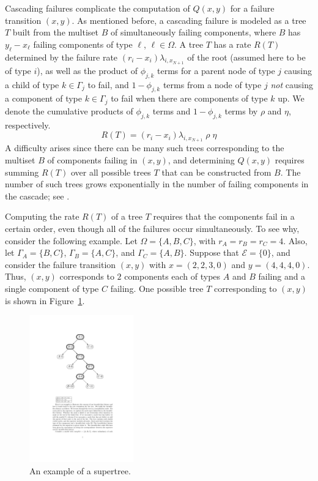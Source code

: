 \documentclass[12pt]{article}
\begin{document}
Cascading failures complicate the computation of $Q(x, y)$ for a failure transition $(x, y)$. As mentioned before, a cascading failure is modeled as a tree $T$ built from the multiset $B$ of simultaneously failing components, where $B$ has $y_\ell - x_\ell$ failing components of type $\ell$, $\ell \in \Omega$. A tree $T$ has a rate $R(T)$ determined by the failure rate $(r_i - x_i) \lambda_{i,x_{N + 1}}$ of the root (assumed here to be of type $i$), as well as the product of $\phi_{j, k}$ terms for a parent node of type $j$ causing a child of type $k \in \Gamma_j$ to fail, and $1 - \phi_{j, k}$ terms from a node of type $j$ \textit{not} causing a component of type $k \in \Gamma_j$ to fail when there are components of type $k$ up. We denote the cumulative products of $\phi_{j, k}$ terms and $1 - \phi_{j, k}$ terms by $\rho$ and $\eta$, respectively. \begin{equation} \label{eq:rate} R(T) = (r_i - x_i) \lambda_{i,x_{N + 1}} \; \rho \; \eta \end{equation} A difficulty arises since there can be many such trees corresponding to the multiset $B$ of components failing in $(x, y)$, and determining $Q(x, y)$ requires summing $R(T)$ over all possible trees $T$ that can be constructed from $B$. The number of such trees grows exponentially in the number of failing components in the cascade; see \cite{ING:2009}.

Computing the rate $R(T)$ of a tree $T$ requires that the components fail in a certain order, even though all of the failures occur simultaneously. To see why, consider the following example. Let $\Omega = \{ A, B, C \}$, with $r_A = r_B = r_C = 4$. Also, let $\Gamma_A = \{ B, C \}$, $\Gamma_B = \{ A, C \}$, and $\Gamma_C = \{ A, B \}$. Suppose that $\mathcal{E} = \{ 0 \}$, and consider the failure transition $(x, y)$ with $x = (2, 2, 3, 0)$ and $y = (4, 4, 4, 0)$. Thus, $(x, y)$ corresponds to $2$ components each of types $A$ and $B$ failing and a single component of type $C$ failing. One possible tree $T$ corresponding to $(x, y)$ is shown in Figure~\ref{fig:tree}.

\begin{figure}
\begin{center}
\includegraphics[width=0.4\textwidth]{fig_tree}
\end{center}
\caption{An example of a supertree.}
\label{fig:tree}
\end{figure}
\end{document}
